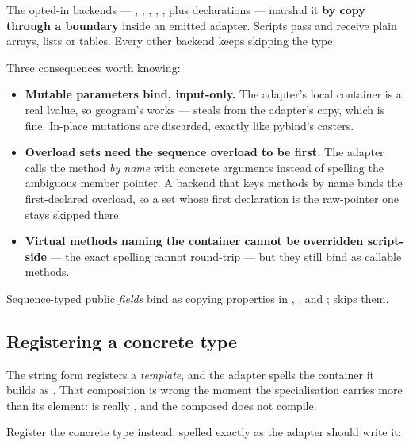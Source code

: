 The opted-in backends --- , , ,
, , plus  declarations --- marshal it
\textbf{by copy through a  boundary} inside an
emitted adapter. Scripts pass and receive plain arrays, lists or tables. Every
other backend keeps skipping the type.

Three consequences worth knowing:

\begin{itemize}
  \item \textbf{Mutable  parameters bind, input-only.} The adapter's
    local container is a real lvalue, so geogram's
     works --- 
    steals from the adapter's copy, which is fine. In-place mutations are
    discarded, exactly like pybind's  casters.
  \item \textbf{Overload sets need the sequence overload to be first.} The
    adapter calls the method \emph{by name} with concrete arguments instead of
    spelling the ambiguous  member pointer. A backend that keys
    methods by name binds the first-declared overload, so a set whose first
    declaration is the raw-pointer one stays skipped there.
  \item \textbf{Virtual methods naming the container cannot be overridden
    script-side} --- the exact spelling cannot round-trip --- but they still
    bind as callable methods.
\end{itemize}

Sequence-typed public \emph{fields} bind as copying properties in
, ,  and ;  skips
them.

\subsection{Registering a concrete type}
\label{sec:concrete}

The string form registers a \emph{template}, and the adapter spells the
container it builds as . That composition is
wrong the moment the specialisation carries more than its element:
 is really , and the
composed  does not compile.

Register the concrete type instead, spelled exactly as the adapter should write
it:

